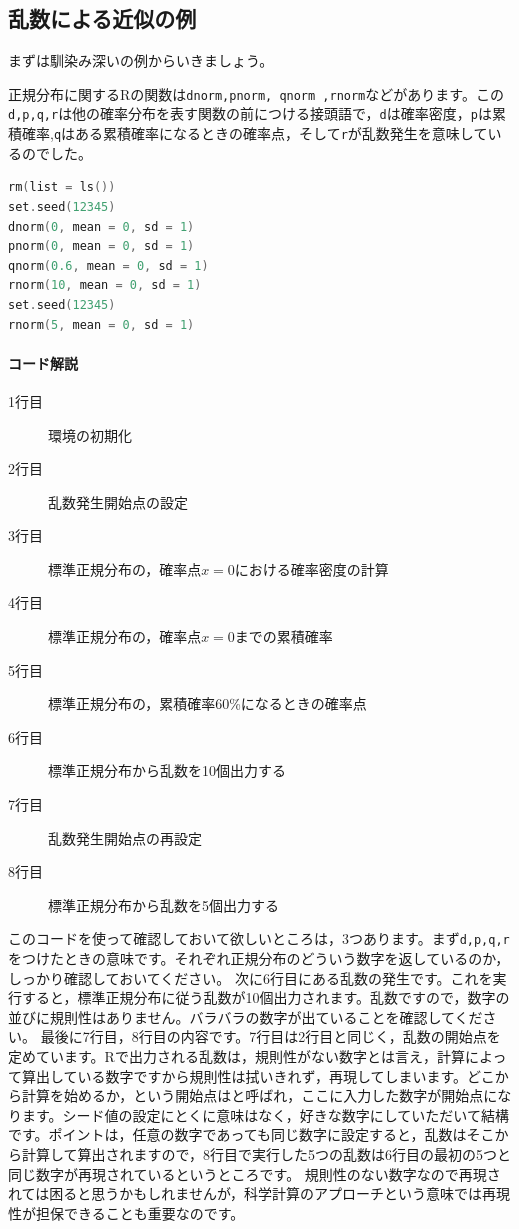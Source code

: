 \documentclass{ltjsbook}
\begin{document}
\subsection{乱数による近似の例}
まずは馴染み深いの例からいきましょう。

正規分布に関するRの関数は\texttt{dnorm,pnorm, qnorm ,rnorm}などがあります。この\texttt{d,p,q,r}は他の確率分布を表す関数の前につける接頭語で，\texttt{d}は確率密度，\texttt{p}は累積確率,\texttt{q}はある累積確率になるときの確率点，そして\texttt{r}が乱数発生を意味しているのでした。

\begin{lstlisting}[language=c++,label={code:03_01},caption={乱数のコードの例}]
rm(list = ls())
set.seed(12345)
dnorm(0, mean = 0, sd = 1)
pnorm(0, mean = 0, sd = 1)
qnorm(0.6, mean = 0, sd = 1)
rnorm(10, mean = 0, sd = 1)
set.seed(12345)
rnorm(5, mean = 0, sd = 1)
\end{lstlisting}
\paragraph{コード解説}
\begin{description}
	\item[1行目] 環境の初期化
	\item[2行目] 乱数発生開始点の設定
	\item[3行目] 標準正規分布の，確率点$x=0$における確率密度の計算
	\item[4行目] 標準正規分布の，確率点$x=0$までの累積確率
	\item[5行目] 標準正規分布の，累積確率60\%になるときの確率点
	\item[6行目] 標準正規分布から乱数を10個出力する
	\item[7行目] 乱数発生開始点の再設定
	\item[8行目] 標準正規分布から乱数を5個出力する
\end{description}

このコードを使って確認しておいて欲しいところは，3つあります。まず\texttt{d,p,q,r}をつけたときの意味です。それぞれ正規分布のどういう数字を返しているのか，しっかり確認しておいてください。
次に6行目にある乱数の発生です。これを実行すると，標準正規分布に従う乱数が10個出力されます。乱数ですので，数字の並びに規則性はありません。バラバラの数字が出ていることを確認してください。
最後に7行目，8行目の内容です。7行目は2行目と同じく，乱数の開始点を定めています。Rで出力される乱数は，規則性がない数字とは言え，計算によって算出している数字ですから規則性は拭いきれず，再現してしまいます。どこから計算を始めるか，という開始点はと呼ばれ，ここに入力した数字が開始点になります。シード値の設定にとくに意味はなく，好きな数字にしていただいて結構です。ポイントは，任意の数字であっても同じ数字に設定すると，乱数はそこから計算して算出されますので，8行目で実行した5つの乱数は6行目の最初の5つと同じ数字が再現されているというところです。
規則性のない数字なので再現されては困ると思うかもしれませんが，科学計算のアプローチという意味では再現性が担保できることも重要なのです。
\end{document}
